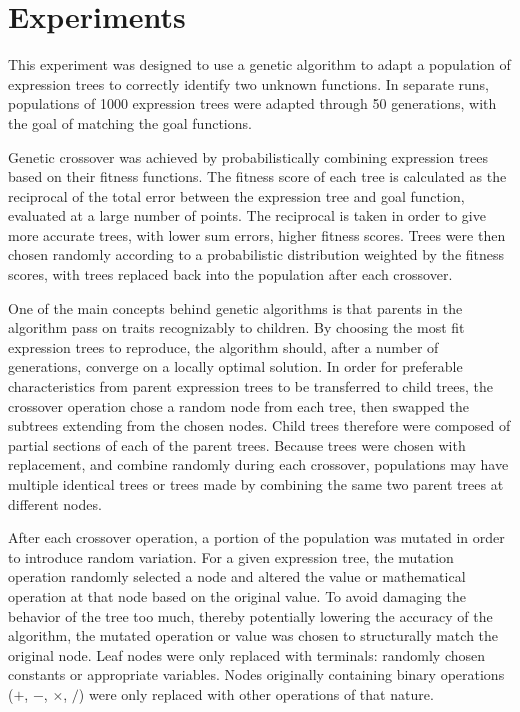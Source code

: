 
\section{Experiments}
\label{sec:expts}

This experiment was designed to use a genetic algorithm to adapt a population of expression trees to correctly identify two unknown functions.  In separate runs, populations of 1000 expression trees were adapted through 50 generations, with the goal of matching the goal functions. 

Genetic crossover was achieved by probabilistically combining expression trees based on their fitness functions.  The fitness score of each tree is calculated as the reciprocal of the total error between the expression tree and goal function, evaluated at a large number of points.  The reciprocal is taken in order to give more accurate trees, with lower sum errors, higher fitness scores.  Trees were then chosen randomly according to a probabilistic distribution weighted by the fitness scores, with trees replaced back into the population after each crossover.

One of the main concepts behind genetic algorithms is that parents in the algorithm pass on traits recognizably to children.  By choosing the most fit expression trees to reproduce, the algorithm should, after a number of generations, converge on a locally optimal solution. In order for preferable characteristics from parent expression trees to be transferred to child trees, the crossover operation chose a random node from each tree, then swapped the subtrees extending from the chosen nodes.  Child trees therefore were composed of partial sections of each of the parent trees.  Because trees were chosen with replacement, and combine randomly during each crossover, populations may have multiple identical trees or trees made by combining the same two parent trees at different nodes.

After each crossover operation, a portion of the population was mutated in order to introduce random variation. For a given expression tree, the mutation operation randomly selected a node and altered the value or mathematical operation at that node based on the original value.  To avoid damaging the behavior of the tree too much, thereby potentially lowering the accuracy of the algorithm, the mutated operation or value was chosen to structurally match the original node.  Leaf nodes were only replaced with terminals: randomly chosen constants or appropriate variables.  Nodes originally containing binary operations ($+$, $-$, $\times$, $/$) were only replaced with other operations of that nature.

